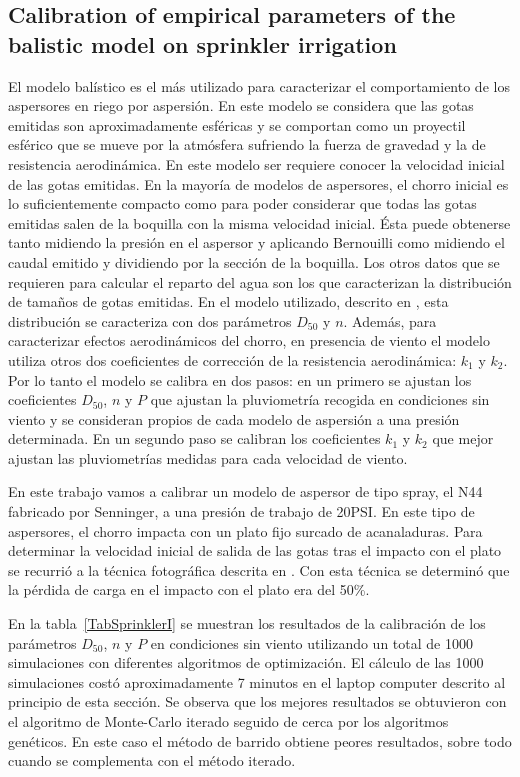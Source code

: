 \documentclass[review,authoryear]{elsarticle}
\begin{document}
\subsection{Calibration of empirical parameters of the balistic model on
sprinkler irrigation}

El modelo balístico \citep{Fukui80,Playan06} es el más utilizado para
caracterizar el comportamiento de los aspersores en riego por aspersión. En este
modelo se considera que las gotas emitidas son aproximadamente esféricas y se
comportan como un proyectil esférico que se mueve por la atmósfera sufriendo la
fuerza de gravedad y la de resistencia aerodinámica. En este modelo ser requiere
conocer la velocidad inicial de las gotas emitidas. En la mayoría de modelos de aspersores, el chorro inicial es lo suficientemente compacto como para poder
considerar que todas las gotas emitidas salen de la boquilla con la misma
velocidad inicial. Ésta puede obtenerse tanto midiendo la presión en el aspersor
y aplicando Bernouilli como midiendo el caudal emitido y dividiendo por la
sección de la boquilla. Los otros datos que se requieren para calcular el
reparto del agua son los que caracterizan la distribución de tamaños de gotas
emitidas. En el modelo utilizado, descrito en \citet{Playan06}, esta
distribución se caracteriza con dos parámetros $D_{50}$ y $n$. Además, para
caracterizar efectos aerodinámicos del chorro, en presencia de viento el modelo
utiliza otros dos coeficientes de corrección de la resistencia aerodinámica:
$k_1$ y $k_2$.
Por lo tanto el modelo se calibra en dos pasos: en un primero se ajustan los
coeficientes $D_{50}$, $n$ y $P$ que ajustan la pluviometría recogida en
condiciones sin viento y se consideran propios de cada modelo de aspersión a una
presión determinada. En un segundo paso se calibran los coeficientes $k_1$ y
$k_2$ que mejor ajustan las pluviometrías medidas para cada velocidad de viento.

En este trabajo vamos a calibrar un modelo de aspersor de tipo spray, el N44
fabricado por Senninger, a una presión de trabajo de 20PSI. En este tipo de
aspersores, el chorro impacta con un plato fijo surcado de acanaladuras. Para
determinar la velocidad inicial de salida de las gotas tras el impacto con el
plato se recurrió a la técnica fotográfica descrita en \citet{Salvador09}. Con
esta técnica se determinó que la pérdida de carga en el impacto con el plato era
del 50\%.

En la tabla~\ref{TabSprinklerI} se muestran los resultados de la calibración de
los parámetros $D_{50}$, $n$ y $P$ en condiciones sin viento utilizando un total
de 1000 simulaciones con diferentes algoritmos de optimización. El cálculo de
las 1000 simulaciones costó aproximadamente 7 minutos en el laptop computer
descrito al principio de esta sección. Se observa que los mejores resultados se
obtuvieron con el algoritmo de Monte-Carlo iterado seguido de cerca por los
algoritmos genéticos. En este caso el método de barrido obtiene peores
resultados, sobre todo cuando se complementa con el método iterado.
\end{document}
